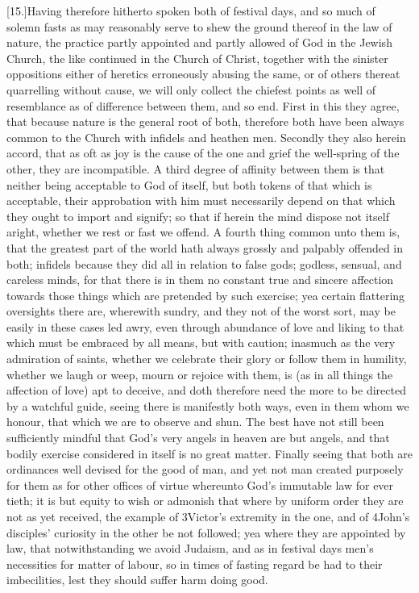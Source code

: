 [15.]Having therefore hitherto spoken both of festival days, and so much of solemn fasts as may reasonably serve  to shew the ground thereof in the law of nature,
 the practice partly appointed and partly allowed of God in the Jewish Church, the like continued in the Church of Christ, together with the sinister oppositions either of heretics erroneously abusing the same, or of others thereat quarrelling without cause, we will only collect the chiefest points as well of resemblance as of difference between them, and so end. First in this they agree, that because nature is the general root of both, therefore both have been always common to the Church with infidels and heathen men. Secondly they also herein accord, that as oft as joy is the cause of the one and grief the well-spring of the other, they are incompatible. A third degree of affinity between them is that neither being acceptable to God of itself, but both tokens of that which is acceptable, their approbation with him must necessarily depend on that which they ought to import and signify; so that if herein the mind dispose not itself aright, whether we rest or fast we offend. A fourth thing common unto them is, that the greatest part of the world hath always grossly and palpably offended in both; infidels because they did all in relation to false gods; godless, sensual, and careless minds, for that there is in them no constant true and sincere affection towards those things which are pretended by such exercise; yea certain flattering oversights there are, wherewith sundry, and they not of the worst sort, may be easily in these cases led awry, even through abundance of love and liking to that which must be embraced by all means, but with caution; inasmuch as the very admiration of saints, whether we celebrate their glory or follow them in humility, whether we laugh or weep, mourn or rejoice with them, is (as in all things the affection of love) apt to deceive, and doth therefore need the more to be directed by a watchful guide, seeing there is manifestly both ways, even in them whom we honour, that which we are to observe and shun. The best have not still been sufficiently mindful that God’s very angels in heaven  are but angels, and that bodily exercise considered in itself is no great matter.
 Finally seeing that both are ordinances well devised for the good of man, and yet not man created purposely for them as for other offices of virtue whereunto God’s immutable law for ever tieth; it is but equity to wish or admonish that where by uniform order they are not as yet received, the example of 3Victor’s extremity in the one, and of 4John’s disciples’ curiosity in the other be not followed; yea where they are appointed by law, that notwithstanding we avoid Judaism, and as in festival days men’s necessities for matter of labour, so in times of fasting regard be had to their imbecilities, lest they should suffer harm doing good.

